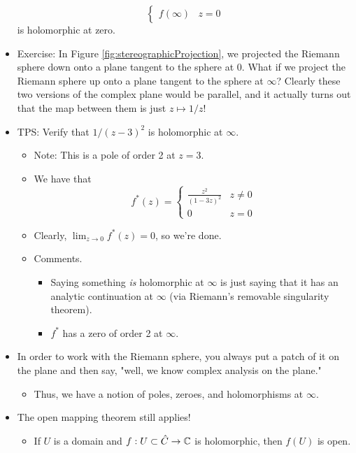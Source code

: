 \documentclass[../notes.tex]{subfiles}
\begin{document}
\begin{itemize}
\begin{equation*}
\begin{cases}
            f(\infty) & z=0
        \end{cases}
    \end{equation*}
    is holomorphic at zero.
    \item Exercise: In Figure \ref{fig:stereographicProjection}, we projected the Riemann sphere down onto a plane tangent to the sphere at 0. What if we project the Riemann sphere up onto a plane tangent to the sphere at $\infty$? Clearly these two versions of the complex plane would be parallel, and it actually turns out that the map between them is just $z\mapsto 1/z$!
    \item TPS: Verify that $1/(z-3)^2$ is holomorphic at $\infty$.
    \begin{itemize}
        \item Note: This is a pole of order 2 at $z=3$.
        \item We have that
        \begin{equation*}
            f^*(z) =
            \begin{cases}
                \frac{z^2}{(1-3z)^2} & z\neq 0\\
                0 & z=0
            \end{cases}
        \end{equation*}
        \item Clearly, $\lim_{z\to 0}f^*(z)=0$, so we're done.
        \item Comments.
        \begin{itemize}
            \item Saying something \emph{is} holomorphic at $\infty$ is just saying that it has an analytic continuation at $\infty$ (via Riemann's removable singularity theorem).
            \item $f^*$ has a zero of order 2 at $\infty$.
        \end{itemize}
    \end{itemize}
    \item In order to work with the Riemann sphere, you always put a patch of it on the plane and then say, "well, we know complex analysis on the plane."
    \begin{itemize}
        \item Thus, we have a notion of poles, zeroes, and holomorphisms at $\infty$.
    \end{itemize}
    \item The open mapping theorem still applies!
    \begin{itemize}
        \item If $U$ is a domain and $f:U\subset\hat{C}\to\mathbb{C}$ is holomorphic, then $f(U)$ is open.

\end{itemize}
\end{itemize}
\end{document}
